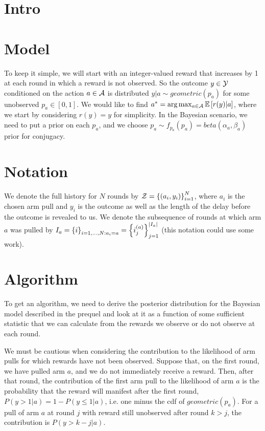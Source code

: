 \documentclass{article}
\begin{document}
\section{Intro} \label{sec:intro}
\section{Model} \label{sec:model}

To keep it simple, we will start with an integer-valued reward that increases by 1 at each round in which a reward is not observed. So the outcome $y \in \mathcal{Y}$ conditioned on the action $a \in \mathcal{A}$ is distributed $y | a \sim geometric(p_a)$ for some unobserved $p_a \in [0,1]$. We would like to find $a^* = \textnormal{arg} \max_{a \in \mathcal{A}} \mathbb{E} \left[ r(y) | a \right]$, where we start by considering $r(y) = y$ for simplicity. In the Bayesian scenario, we need to put a prior on each $p_a$, and we choose $p_a \sim f_{p_a}(p_a) = beta(\alpha_a, \beta_a)$ prior for conjugacy.

\section{Notation} \label{subsec:notation}
We denote the full history for $N$ rounds by $\mathcal{Z} = \left \{ (a_i, y_i) \right \}_{i=1}^N$, where $a_i$ is the chosen arm pull and $y_i$ is the outcome as well as the length of the delay before the outcome is revealed to us. We denote the subsequence of rounds at which arm $a$ was pulled by $I_a = \left \{ i \right \}_{i=1, \ldots, N: a_i = a} = \left \{ i_j^{(a)} \right \}_{j=1}^{|I_a|}$ (this notation could use some work).

\section{Algorithm} \label{sec:alg}
To get an algorithm, we need to derive the posterior distribution for the Bayesian model described in the prequel and look at it as a function of some sufficient statistic that we can calculate from the rewards we observe or do not observe at each round. 

We must be cautious when considering the contribution to the likelihood of arm pulls for which rewards have not been observed. Suppose that, on the first round, we have pulled arm $a$, and we do not immediately receive a reward. Then, after that round, the contribution of the first arm pull to the likelihood of arm $a$ is the probability that the reward will manifest after the first round, $P(y > 1 | a) = 1 - P(y \leq 1 | a)$, i.e. one minus the cdf of $geometric(p_a)$. For a pull of arm $a$ at round $j$ with reward still unobserved after round $k > j$, the contribution is $P(y > k - j | a)$.
\end{document}
